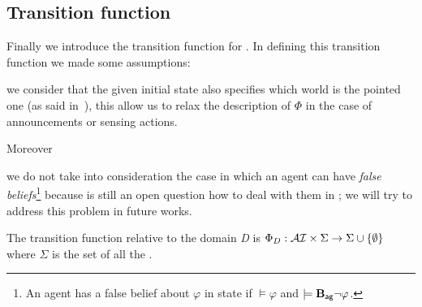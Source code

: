 %
%
%
\subsection{Transition function} \label{subsec-contribution:transfunc}
	Finally we introduce the transition function for \ourL.
	In defining this transition function we made some assumptions:
	\begin{enumerate*}[label=\roman*)]
		\item we consider that the given initial state also specifies which world is the pointed one (as said in~\cite{baral2015action}), this allow us to relax the description of $\Phi$ in the case of announcements or sensing actions.

		Moreover \item we do not take into consideration the case in which an agent can have \emph{false beliefs}\footnote{An agent  has a false belief about $\varphi$ in state  if  $\models \varphi$ and  $\models \bB{ag}{\neg \varphi}$.} because is still an open question how to deal with them in \mep; we will try to address this problem in future works.
	\end{enumerate*} 
	The transition function relative to the domain \emph{D} is $\Phi_D: \mathcal{A}\mathcal{I}\times\Sigma \rightarrow \Sigma \cup \{\emptyset\}$ where $\Sigma$ is the set of all the \posS.
	
